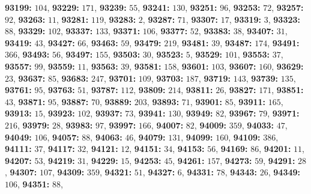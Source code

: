 \textsf{\bfseries 93199:} $104$, \textsf{\bfseries 93229:} $171$, \textsf{\bfseries 93239:} $55$, \textsf{\bfseries 93241:} $130$, \textsf{\bfseries 93251:} $96$, \textsf{\bfseries 93253:} $72$, \textsf{\bfseries 93257:} $92$, \textsf{\bfseries 93263:} $11$, \textsf{\bfseries 93281:} $119$, \textsf{\bfseries 93283:} $2$, \textsf{\bfseries 93287:} $71$, \textsf{\bfseries 93307:} $17$, \textsf{\bfseries 93319:} $3$, \textsf{\bfseries 93323:} $88$, \textsf{\bfseries 93329:} $102$, \textsf{\bfseries 93337:} $133$, \textsf{\bfseries 93371:} $106$, \textsf{\bfseries 93377:} $52$, \textsf{\bfseries 93383:} $38$, \textsf{\bfseries 93407:} $31$, \textsf{\bfseries 93419:} $43$, \textsf{\bfseries 93427:} $66$, \textsf{\bfseries 93463:} $59$, \textsf{\bfseries 93479:} $219$, \textsf{\bfseries 93481:} $39$, \textsf{\bfseries 93487:} $174$, \textsf{\bfseries 93491:} $366$, \textsf{\bfseries 93493:} $56$, \textsf{\bfseries 93497:} $155$, \textsf{\bfseries 93503:} $30$, \textsf{\bfseries 93523:} $5$, \textsf{\bfseries 93529:} $101$, \textsf{\bfseries 93553:} $37$, \textsf{\bfseries 93557:} $99$, \textsf{\bfseries 93559:} $11$, \textsf{\bfseries 93563:} $39$, \textsf{\bfseries 93581:} $158$, \textsf{\bfseries 93601:} $103$, \textsf{\bfseries 93607:} $160$, \textsf{\bfseries 93629:} $23$, \textsf{\bfseries 93637:} $85$, \textsf{\bfseries 93683:} $247$, \textsf{\bfseries 93701:} $109$, \textsf{\bfseries 93703:} $187$, \textsf{\bfseries 93719:} $143$, \textsf{\bfseries 93739:} $135$, \textsf{\bfseries 93761:} $95$, \textsf{\bfseries 93763:} $51$, \textsf{\bfseries 93787:} $112$, \textsf{\bfseries 93809:} $214$, \textsf{\bfseries 93811:} $26$, \textsf{\bfseries 93827:} $171$, \textsf{\bfseries 93851:} $43$, \textsf{\bfseries 93871:} $95$, \textsf{\bfseries 93887:} $70$, \textsf{\bfseries 93889:} $203$, \textsf{\bfseries 93893:} $71$, \textsf{\bfseries 93901:} $85$, \textsf{\bfseries 93911:} $165$, \textsf{\bfseries 93913:} $15$, \textsf{\bfseries 93923:} $102$, \textsf{\bfseries 93937:} $73$, \textsf{\bfseries 93941:} $130$, \textsf{\bfseries 93949:} $82$, \textsf{\bfseries 93967:} $79$, \textsf{\bfseries 93971:} $216$, \textsf{\bfseries 93979:} $28$, \textsf{\bfseries 93983:} $97$, \textsf{\bfseries 93997:} $166$, \textsf{\bfseries 94007:} $82$, \textsf{\bfseries 94009:} $359$, \textsf{\bfseries 94033:} $47$, \textsf{\bfseries 94049:} $106$, \textsf{\bfseries 94057:} $88$, \textsf{\bfseries 94063:} $46$, \textsf{\bfseries 94079:} $131$, \textsf{\bfseries 94099:} $160$, \textsf{\bfseries 94109:} $386$, \textsf{\bfseries 94111:} $37$, \textsf{\bfseries 94117:} $32$, \textsf{\bfseries 94121:} $12$, \textsf{\bfseries 94151:} $34$, \textsf{\bfseries 94153:} $56$, \textsf{\bfseries 94169:} $86$, \textsf{\bfseries 94201:} $11$, \textsf{\bfseries 94207:} $53$, \textsf{\bfseries 94219:} $31$, \textsf{\bfseries 94229:} $15$, \textsf{\bfseries 94253:} $45$, \textsf{\bfseries 94261:} $157$, \textsf{\bfseries 94273:} $59$, \textsf{\bfseries 94291:} $28$, \textsf{\bfseries 94307:} $107$, \textsf{\bfseries 94309:} $359$, \textsf{\bfseries 94321:} $51$, \textsf{\bfseries 94327:} $6$, \textsf{\bfseries 94331:} $78$, \textsf{\bfseries 94343:} $26$, \textsf{\bfseries 94349:} $106$, \textsf{\bfseries 94351:} $88$, 
